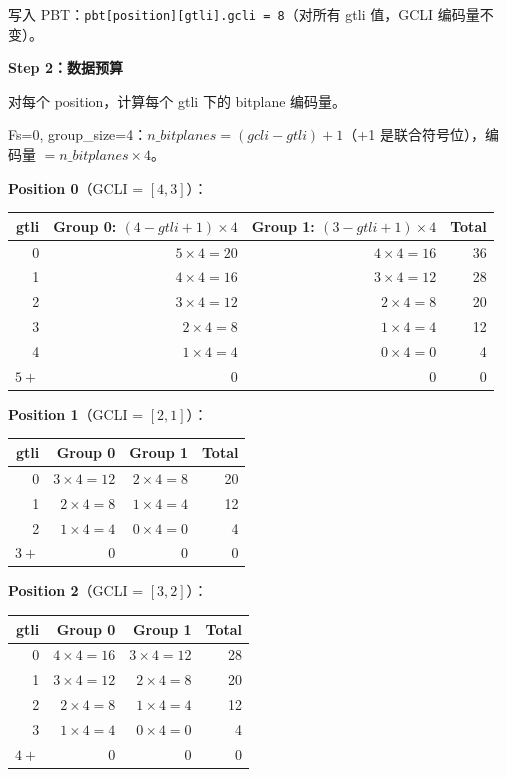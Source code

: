 \begin{examplebox}[title={RC Worked Example 1：从 Precinct 数据推导预算表}]
写入 PBT：\texttt{pbt[position][gtli].gcli = 8}（对所有 gtli 值，GCLI 编码量不变）。

\textbf{Step 2：数据预算}

对每个 position，计算每个 gtli 下的 bitplane 编码量。

Fs=0, group\_size=4：$\mathit{n\_bitplanes} = (\mathit{gcli} - \mathit{gtli}) + 1$（+1 是联合符号位），编码量 $= \mathit{n\_bitplanes} \times 4$。

\textbf{Position 0}（GCLI = $[4, 3]$）：

\begin{tabular}{@{}rrrr@{}}
\toprule
gtli & Group 0: $(4{-}\mathit{gtli}{+}1){\times}4$ & Group 1: $(3{-}\mathit{gtli}{+}1){\times}4$ & Total \\
\midrule
0 & $5 \times 4 = 20$ & $4 \times 4 = 16$ & 36 \\
1 & $4 \times 4 = 16$ & $3 \times 4 = 12$ & 28 \\
2 & $3 \times 4 = 12$ & $2 \times 4 = 8$  & 20 \\
3 & $2 \times 4 = 8$  & $1 \times 4 = 4$  & 12 \\
4 & $1 \times 4 = 4$  & $0 \times 4 = 0$  & 4  \\
$5+$ & 0 & 0 & 0 \\
\bottomrule
\end{tabular}

\textbf{Position 1}（GCLI = $[2, 1]$）：

\begin{tabular}{@{}rrrr@{}}
\toprule
gtli & Group 0 & Group 1 & Total \\
\midrule
0 & $3 \times 4 = 12$ & $2 \times 4 = 8$  & 20 \\
1 & $2 \times 4 = 8$  & $1 \times 4 = 4$  & 12 \\
2 & $1 \times 4 = 4$  & $0 \times 4 = 0$  & 4  \\
$3+$ & 0 & 0 & 0 \\
\bottomrule
\end{tabular}

\textbf{Position 2}（GCLI = $[3, 2]$）：

\begin{tabular}{@{}rrrr@{}}
\toprule
gtli & Group 0 & Group 1 & Total \\
\midrule
0 & $4 \times 4 = 16$ & $3 \times 4 = 12$ & 28 \\
1 & $3 \times 4 = 12$ & $2 \times 4 = 8$  & 20 \\
2 & $2 \times 4 = 8$  & $1 \times 4 = 4$  & 12 \\
3 & $1 \times 4 = 4$  & $0 \times 4 = 0$  & 4  \\
$4+$ & 0 & 0 & 0 \\
\bottomrule
\end{tabular}


\end{examplebox}
